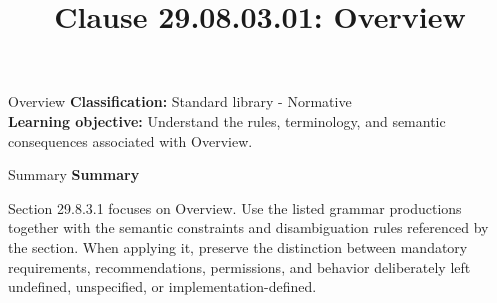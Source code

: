 \documentclass[10pt,letterpaper]{article}
\title{Clause 29.08.03.01: Overview}
\author{}
\date{}
\begin{document}
\maketitle
\begin{CornellOverviewBox}{Overview}
\textbf{Classification:} Standard library - Normative\\[2pt]
\textbf{Learning objective:} Understand the rules, terminology, and semantic consequences associated with Overview.
\end{CornellOverviewBox}\begin{CornellSummaryBox}{Summary}
{\sffamily\bfseries\color{Accent} Summary}\par\vspace{3pt}Section 29.8.3.1 focuses on Overview. Use the listed grammar productions together with the semantic constraints and disambiguation rules referenced by the section. When applying it, preserve the distinction between mandatory requirements, recommendations, permissions, and behavior deliberately left undefined, unspecified, or implementation-defined.
\end{CornellSummaryBox}
\end{document}

